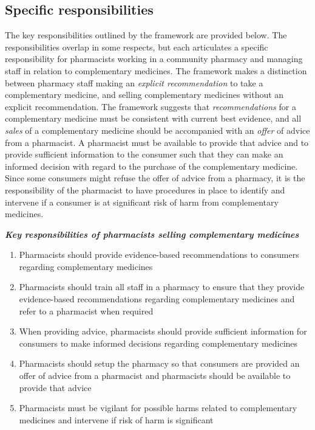 \documentclass[12pt,]{article}
\providecommand{\tightlist}{%
  \setlength{\itemsep}{0pt}\setlength{\parskip}{0pt}}
\begin{document}
\subsection{Specific responsibilities}\label{specific-responsibilities}

The key responsibilities outlined by the framework are provided below.
The responsibilities overlap in some respects, but each articulates a
specific responsibility for pharmacists working in a community pharmacy
and managing staff in relation to complementary medicines. The framework
makes a distinction between pharmacy staff making an \emph{explicit
recommendation} to take a complementary medicine, and selling
complementary medicines without an explicit recommendation. The
framework suggests that \emph{recommendations} for a complementary
medicine must be consistent with current best evidence, and all
\emph{sales} of a complementary medicine should be accompanied with an
\emph{offer} of advice from a pharmacist. A pharmacist must be available
to provide that advice and to provide sufficient information to the
consumer such that they can make an informed decision with regard to the
purchase of the complementary medicine. Since some consumers might
refuse the offer of advice from a pharmacy, it is the responsibility of
the pharmacist to have procedures in place to identify and intervene if
a consumer is at significant risk of harm from complementary medicines.

\textbf{\emph{Key responsibilities of pharmacists selling complementary
medicines}}

\begin{enumerate}
\def\labelenumi{\arabic{enumi}.}
\tightlist
\item
  Pharmacists should provide evidence-based recommendations to consumers
  regarding complementary medicines
\item
  Pharmacists should train all staff in a pharmacy to ensure that they
  provide evidence-based recommendations regarding complementary
  medicines and refer to a pharmacist when required
\item
  When providing advice, pharmacists should provide sufficient
  information for consumers to make informed decisions regarding
  complementary medicines
\item
  Pharmacists should setup the pharmacy so that consumers are provided
  an offer of advice from a pharmacist and pharmacists should be
  available to provide that advice
\item
  Pharmacists must be vigilant for possible harms related to
  complementary medicines and intervene if risk of harm is significant
\end{enumerate}
\end{document}

